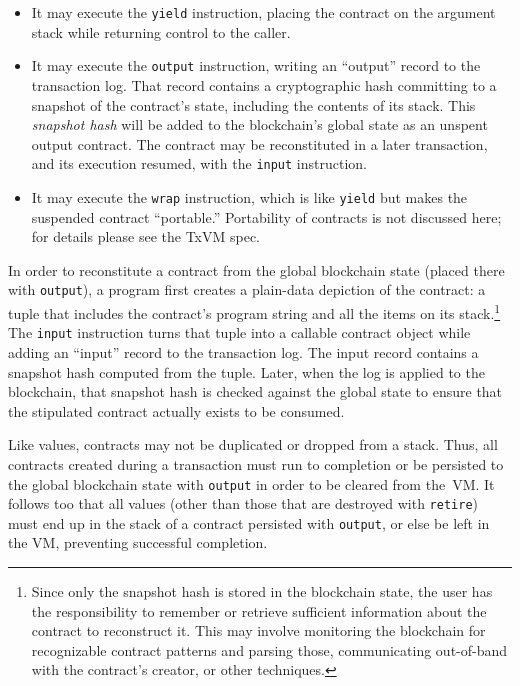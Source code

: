 \documentclass{article}
\newcommand{\txvm}{TxVM}
\begin{document}
\begin{itemize}

\item It may execute the \texttt{yield} instruction, placing the
  contract on the argument stack while returning control to the
  caller.

\item It may execute the \texttt{output} instruction, writing an
  ``output'' record to the transaction log. That record contains a cryptographic hash committing to a snapshot of the contract's state, including the contents of its stack. This \textit{snapshot hash} will be added to the
  blockchain's global state as an unspent output contract. The
  contract may be reconstituted in a later transaction, and its
  execution resumed, with the \texttt{input} instruction.

\item It may execute the \texttt{wrap} instruction, which is like
  \texttt{yield} but makes the suspended contract ``portable.''
  Portability of contracts is not discussed here; for details please
  see the \txvm{} spec. \cite{txvm-spec}

\end{itemize}

In order to reconstitute a contract from the global blockchain state
(placed there with \texttt{output}), a program first creates a
plain-data depiction of the contract: a tuple that includes the
contract's program string and all the items on its
stack.\footnote{Since only the snapshot hash is stored in the
blockchain state, the user has the responsibility to remember or
retrieve sufficient information about the contract to reconstruct
it. This may involve monitoring the blockchain for recognizable
contract patterns and parsing those, communicating out-of-band with
the contract's creator, or other techniques.}  The \texttt{input}
instruction turns that tuple into a callable contract object while
adding an ``input'' record to the transaction log. The input record
contains a snapshot hash computed from the tuple. Later, when the log
is applied to the blockchain, that snapshot hash is checked against
the global state to ensure that the stipulated contract actually
exists to be consumed.

Like values, contracts may not be duplicated or dropped from a
stack. Thus, all contracts created during a transaction must run to
completion or be persisted to the global blockchain state with
\texttt{output} in order to be cleared from the~VM. It follows too
that all values (other than those that are destroyed with
\texttt{retire}) must end up in the stack of a contract persisted with
\texttt{output}, or else be left in the VM, preventing successful
completion.
\end{document}
